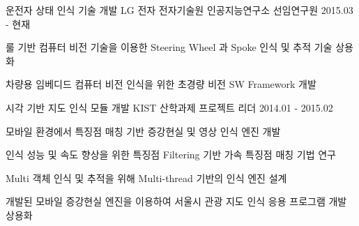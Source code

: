 


\begin{cventries}

  \cventry
    {운전자 상태 인식 기술 개발} %
    {LG 전자 전자기술원 인공지능연구소} %
    {선임연구원} %
    {2015.03 - 현재} %
    {
      \begin{cvitems} %
        \item {룰 기반 컴퓨터 비전 기술을 이용한 Steering Wheel 과 Spoke 인식 및 추적 기술 상용화}
        \item {차량용 임베디드 컴퓨터 비전 인식을 위한 초경량 비전 SW Framework 개발}
      \end{cvitems}
    }

  \cventry
    {시각 기반 지도 인식 모듈 개발} %
    {KIST 산학과제} %
    {프로젝트 리더} %
    {2014.01 - 2015.02} %
    {
      \begin{cvitems} %
        \item {모바일 환경에서 특징점 매칭 기반 증강현실 및 영상 인식 엔진 개발}
        \item {인식 성능 및 속도 향상을 위한 특징점 Filtering 기반 가속 특징점 매칭 기법 연구}
        \item {Multi 객체 인식 및 추적을 위해 Multi-thread 기반의 인식 엔진 설계}
        \item {개발된 모바일 증강현실 엔진을 이용하여 서울시 관광 지도 인식 응용 프로그램 개발 상용화}
      \end{cvitems}
    }


\end{cventries}
